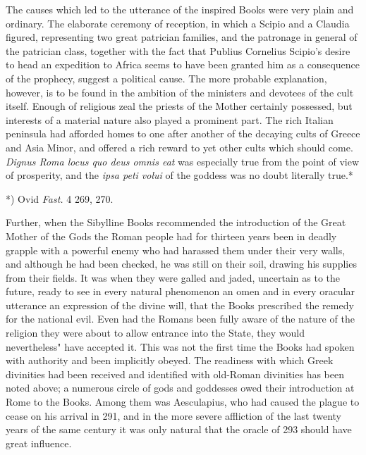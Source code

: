 \documentclass[a4paper, 11pt, oneside, polutonikogreek, english]{article}
\begin{document}
The causes which led to the utterance of the inspired Books were very plain and ordinary. The elaborate ceremony of reception, in which a Scipio and a Claudia figured, representing two great patrician families, and the patronage in general of the patrician class, together with the fact that Publius Cornelius Scipio's desire to head an expedition to Africa seems to have been granted him as a consequence of the prophecy, suggest a political cause. The more probable explanation, however, is to be found in the ambition of the ministers and devotees of the cult itself. Enough of religious zeal the priests of the Mother certainly possessed, but interests of a material nature also played a prominent part. The rich Italian peninsula had afforded homes to one after another of the decaying cults of Greece and Asia Minor, and offered a rich reward to yet other cults which should come. \emph{Dignus Roma locus quo deus omnis eat} was especially true from the point of view of prosperity, and the \emph{ipsa peti volui} of the goddess was no doubt literally true.*

*) Ovid \emph{Fast.} 4 269, 270.

Further, when the Sibylline Books recommended the introduction of the Great Mother of the Gods the Roman people had for thirteen years been in deadly grapple with a powerful enemy who had harassed them under their very walls, and although he had been checked, he was still on their soil, drawing his supplies from their fields. It was when they were galled and jaded, uncertain as to the future, ready to see in every natural phenomenon an omen and in every oracular utterance an expression of the divine will, that the Books prescribed the remedy for the national evil. Even had the Romans been fully aware of the nature of the religion they were about to allow entrance into the State, they would nevertheless" have accepted it. This was not the first time the Books had spoken with authority and been implicitly obeyed. The readiness with which Greek divinities had been received and identified with old-Roman divinities has been noted above; a numerous circle of gods and goddesses owed their introduction at Rome to the Books. Among them was Aesculapius, who had caused the plague to cease on his arrival in 291, and in the more severe affliction of the last twenty years of the same century it was only natural that the oracle of 293 should have great influence.
\end{document}
